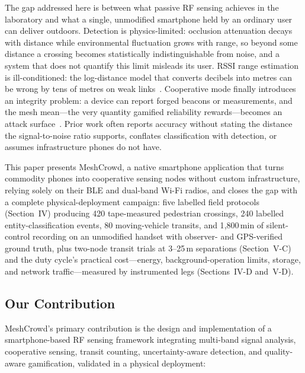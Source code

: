 \documentclass[journal,10pt]{IEEEtran}
\begin{document}
The gap addressed here is between what passive RF sensing achieves in the
laboratory and what a single, unmodified smartphone held by an ordinary user
can deliver outdoors. Detection is physics-limited: occlusion attenuation
decays with distance while environmental fluctuation grows with range, so
beyond some distance a crossing becomes statistically indistinguishable from
noise, and a system that does not quantify this limit misleads its user. RSSI
range estimation is ill-conditioned: the log-distance model that converts
decibels into metres can be wrong by tens of metres on weak
links~\cite{ramirez2021,milano2024}. Cooperative mode finally introduces an
integrity problem: a device can report forged beacons or measurements, and
the mesh mean---the very quantity gamified reliability rewards---becomes an
attack surface~\cite{casar2022,antonioli2020}. Prior work often reports
accuracy without stating the distance the signal-to-noise ratio supports,
conflates classification with detection, or assumes infrastructure phones do
not have.

This paper presents MeshCrowd, a native smartphone application that turns
commodity phones into cooperative sensing nodes without custom
infrastructure, relying solely on their BLE and dual-band Wi-Fi radios, and
closes the gap with a complete physical-deployment campaign: five labelled
field protocols (Section~IV) producing 420 tape-measured pedestrian
crossings, 240 labelled entity-classification events, 80 moving-vehicle
transits, and 1{,}800\,min of silent-control recording on an unmodified
handset with observer- and GPS-verified ground truth, plus two-node transit
trials at 3--25\,m separations (Section~V-C) and the duty cycle's practical
cost---energy, background-operation limits, storage, and network
traffic---measured by instrumented legs (Sections~IV-D and~V-D).

\subsection{Our Contribution}
MeshCrowd's primary contribution is the design and implementation of a
smartphone-based RF sensing framework integrating multi-band signal analysis,
cooperative sensing, transit counting, uncertainty-aware detection, and
quality-aware gamification, validated in a physical deployment:
\end{document}
